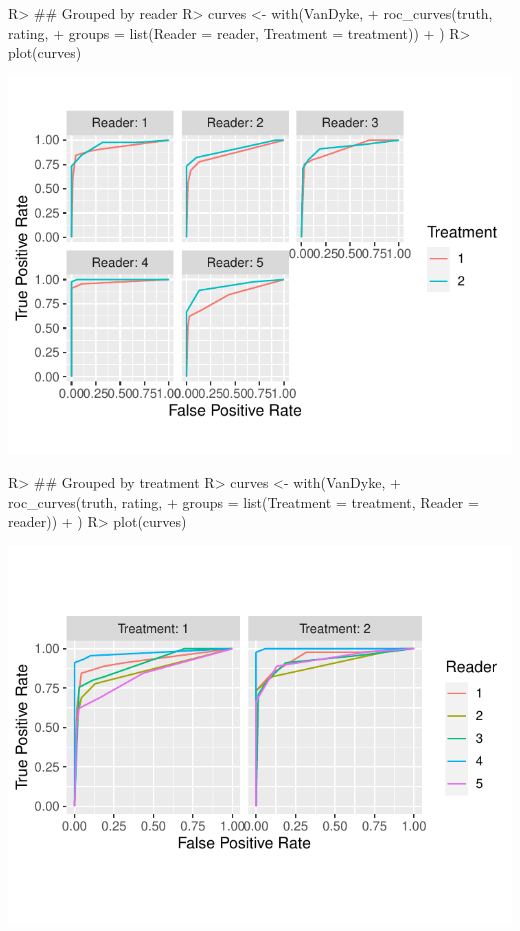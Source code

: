 \documentclass[
]{jss}
\begin{document}
\begin{CodeChunk}
\begin{CodeInput}
R> ## Grouped by reader
R> curves <- with(VanDyke, {
+   roc_curves(truth, rating,
+              groups = list(Reader = reader, Treatment = treatment))
+ })
R> plot(curves)
\end{CodeInput}


\begin{center}\includegraphics{MRMCaov_files/figure-latex/using_curves_reader-1} \end{center}

\end{CodeChunk}

\begin{CodeChunk}
\begin{CodeInput}
R> ## Grouped by treatment
R> curves <- with(VanDyke, {
+   roc_curves(truth, rating,
+              groups = list(Treatment = treatment, Reader = reader))
+ })
R> plot(curves)
\end{CodeInput}


\begin{center}\includegraphics{MRMCaov_files/figure-latex/using_curves_treatment-1} \end{center}

\end{CodeChunk}
\end{document}
